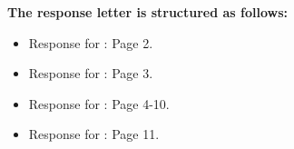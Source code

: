 \documentclass[journal,12pn, onecolumn]{IEEEtran}
\begin{document}
\textbf{The response letter is structured as follows:}\\

\begin{itemize}
    \item [$\bullet$]Response for : Page 2.\\
    \item [$\bullet$]Response for : Page 3.\\
    \item [$\bullet$]Response for : Page 4-10.\\
    \item [$\bullet$]Response for : Page 11.\\
\end{itemize}

\newpage

















\end{document}
